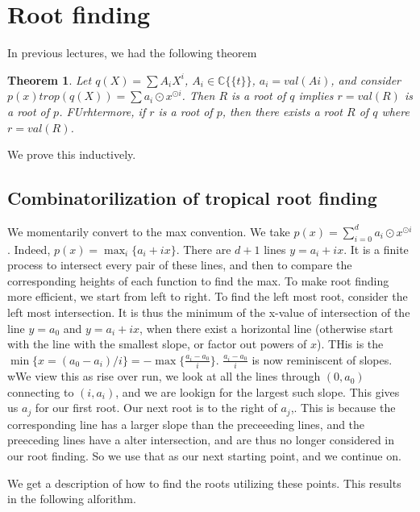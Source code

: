 \documentclass[12pt]{memoir}
\newtheorem{prototheorem}{Theorem}[section]
\newenvironment{theorem}
   {\begin{prototheorem}}
   {\end{prototheorem}}
\theoremstyle{definition}
\def\CC{{\mathbb C}}
\begin{document}

\section{Root finding}

In previous lectures, we had the following theorem

\begin{theorem}
    Let $q(X) = \sum A_iX^i$, $A_i \in \CC \{\{t\}\}$, $a_i = val(Ai)$, and consider $p(x)  trop (q(X)) = \sum a_i \odot x^{\odot i}$. Then $R$ is a root of $q$ implies $r=val(R)$ is a root of $p$. FUrhtermore, if $r$ is a root of $p$, then there exists a root $R$ of $q$ where $r = val(R)$.
\end{theorem}
We prove this inductively. 


\subsection{Combinatorilization of tropical root finding}

We momentarily convert to the max convention. We take $p(x) = \sum\limits_{i=0}^d a_i \odot x^{\odot i}$. Indeed, $p(x) = \max_i \{a_i + ix\}$. There are $d+1$ lines $y= a_i + ix$. It is a finite process to intersect every pair of these lines, and then to compare the corresponding heights of each function to find the max. To make root finding more efficient, we start from left to right. To find the left most root, consider the left most intersection. It is thus the minimum of the x-value of intersection of the line $y=a_0$ and $y=a_i + ix$, when there exist a horizontal line (otherwise start with the line with the smallest slope, or factor out powers of $x$). THis is the $\min\{ x= (a_0-a_i)/i\}=-\max \{\frac{a_i-a_0}{i}\}$. $\frac{a_i-a_0}{i}$ is now reminiscent of slopes. wWe view this as rise over run, we look at all the lines through $(0,a_0)$ connecting to $(i,a_i)$, and we are lookign for the largest such slope. This gives us $a_j$ for our first root. Our next root is to the right of $a_j$,. This is because the corresponding line has a larger slope than the preceeeding lines, and the preeceding lines have a alter intersection, and are thus no longer considered in our root finding. So we use that as our next starting point, and we continue on.

We get a description of how to find the roots utilizing these points. This results in the following alforithm.
\end{document}
